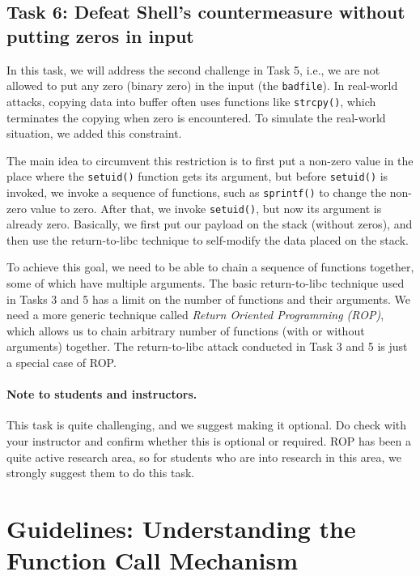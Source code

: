 \subsection{Task 6: Defeat Shell's countermeasure without putting zeros in input}


In this task, we will address the second challenge in Task 5, i.e., we are 
not allowed to put any zero (binary zero) 
in the input (the \texttt{badfile}). In real-world attacks,
copying data into buffer often uses functions like \texttt{strcpy()}, which
terminates the copying when zero is encountered. To simulate the real-world
situation, we added this constraint. 

The main idea to circumvent this restriction 
is to first put a non-zero value in the place where
the \texttt{setuid()} function gets its argument, but before 
\texttt{setuid()} is invoked, we invoke a sequence of 
functions, such as \texttt{sprintf()} to change the non-zero
value to zero. After that, we invoke \texttt{setuid()}, but now 
its argument is already zero. Basically, we first put our payload 
on the stack (without zeros), and then use the return-to-libc technique to self-modify
the data placed on the stack. 

To achieve this goal, we need to
be able to chain a sequence of functions together, some of which
have multiple arguments. The basic return-to-libc technique used in Tasks 3 
and 5 has a limit on the number of functions and their arguments. 
We need a more generic technique called 
\textit{Return Oriented Programming (ROP)}, which allows us to 
chain arbitrary number of functions (with or without arguments)
together. The return-to-libc attack conducted in Task 3 and 5 
is just a special case of ROP. 


\paragraph{Note to students and instructors.}
This task is quite challenging, and we suggest making it optional. Do check with
your instructor and confirm whether this is optional or required. 
ROP has been a quite active research area, so for students who are into
research in this area, we strongly suggest them to do this task.  



\section{Guidelines: Understanding the Function Call Mechanism}

